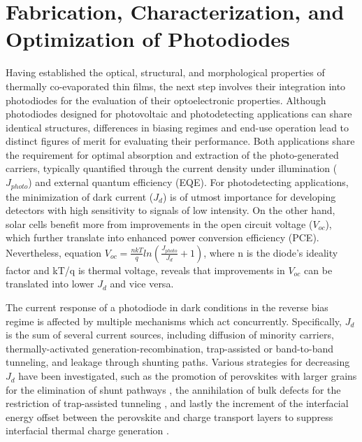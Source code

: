 \chapter{Fabrication, Characterization, and Optimization of  Photodiodes}\label{ch:transport_layer}


Having established the optical, structural, and morphological properties of thermally co-evaporated  thin films, the next step involves their integration into photodiodes for the evaluation of their optoelectronic properties. Although photodiodes designed for photovoltaic and photodetecting applications can share identical structures, differences in biasing regimes and end-use operation lead to distinct figures of merit for evaluating their performance. Both applications share the requirement for optimal absorption and extraction of the photo-generated carriers, typically quantified through the current density under illumination ($J_{photo}$) and external quantum efficiency (EQE). For photodetecting applications, the minimization of dark current ($J_d$) is of utmost importance for developing detectors with high sensitivity to signals of low intensity. On the other hand, solar cells benefit more from improvements in the open circuit voltage ($V_{oc}$), which further translate into enhanced power conversion efficiency (PCE). Nevertheless, equation $V_{oc} = \frac{nkT}{q}ln(\frac{J_{photo}}{J_{d}}+1)$, where n is the diode's ideality factor and kT/q is thermal voltage, reveals that improvements in $V_{oc}$ can be translated into lower $J_d$ and vice versa. 

The current response of a photodiode in dark conditions in the reverse bias regime is affected by multiple mechanisms which act concurrently. Specifically, $J_d$ is the sum of several current sources, including diffusion of minority carriers, thermally-activated generation-recombination, trap-assisted or band-to-band tunneling, and leakage through shunting paths. Various strategies for decreasing $J_d$ have been investigated, such as the promotion of perovskites with larger grains for the elimination of shunt pathways \cite{Jang2022PreventionPhotodetection, Yang2024High-PerformancePathways}, the annihilation of bulk defects for the restriction of trap-assisted tunneling \cite{Furlan2022TuningDetectivity, Yao2019High-Rubidium-Formamidinium-RatioStability, Li2020Self-poweredStability}, and lastly the increment of the interfacial energy offset between the perovskite and charge transport layers to suppress interfacial thermal charge generation \cite{Ollearo2021UltralowGeneration, Martinez-Goyeneche2024Vacuum-DepositedDetection, Ollearo2022MultidimensionalPhotodiodes}. 

